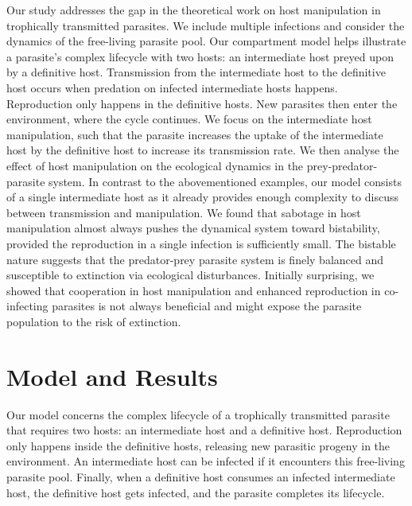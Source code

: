 \documentclass[a4paper]{scrartcl}
\begin{document}
Our study addresses the gap in the theoretical work on host manipulation in trophically transmitted parasites.
We include multiple infections and consider the dynamics of the free-living parasite pool. 
Our compartment model helps illustrate a parasite's complex lifecycle with two hosts: an intermediate host preyed upon by a definitive host. 
Transmission from the intermediate host to the definitive host occurs when predation on infected intermediate hosts happens. 
Reproduction only happens in the definitive hosts. 
New parasites then enter the environment, where the cycle continues. 
We focus on the intermediate host manipulation, such that the parasite increases the uptake of the intermediate host by the definitive host to increase its transmission rate. 
We then analyse the effect of host manipulation on the ecological dynamics in the prey-predator-parasite system. 
In contrast to the abovementioned examples, our model consists of a single intermediate host as it already provides enough complexity to discuss between transmission and manipulation.
We found that sabotage in host manipulation almost always pushes the dynamical system toward bistability, provided the reproduction in a single infection is sufficiently small. 
The bistable nature suggests that the predator-prey parasite system is finely balanced and susceptible to extinction via ecological disturbances. 
Initially surprising, we showed that cooperation in host manipulation and enhanced reproduction in co-infecting parasites is not always beneficial and might expose the parasite population to the risk of extinction.

\section*{Model and Results}

Our model concerns the complex lifecycle of a trophically transmitted parasite that requires two hosts: an intermediate host and a definitive host. 
Reproduction only happens inside the definitive hosts, releasing new parasitic progeny in the environment. 
An intermediate host can be infected if it encounters this free-living parasite pool. 
Finally, when a definitive host consumes an infected intermediate host, the definitive host gets infected, and the parasite completes its lifecycle.
\end{document}
